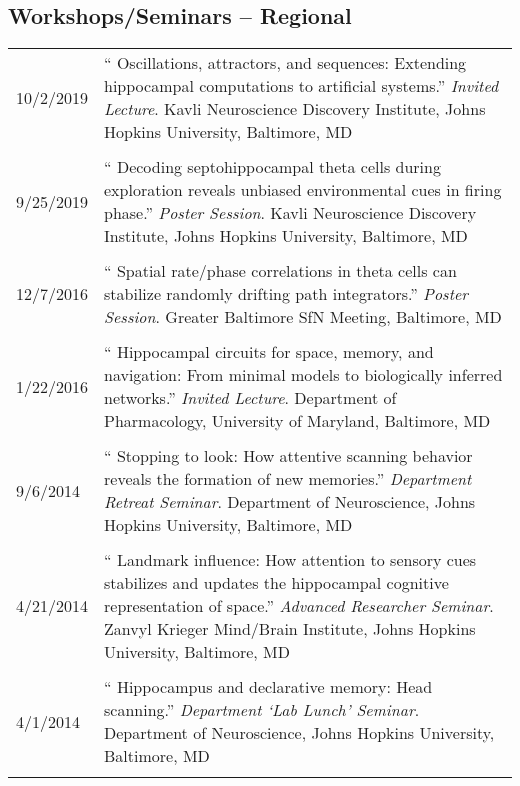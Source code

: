 \documentclass[10pt]{article}
\newcommand{\unpubtitle}[1]{{\color{hopkinsblue} #1}}
\begin{document}
\subsection*{Workshops/Seminars -- Regional}

\begin{longtable}{@{\hspace{0.2in}}l>{\raggedright\arraybackslash}p{}}
  10/2/2019 \hspace{0.1in} & ``\unpubtitle{Oscillations, attractors, and
  sequences: Extending hippocampal computations to artificial systems}.''
  \emph{Invited Lecture}. Kavli Neuroscience Discovery Institute, Johns Hopkins
  University, Baltimore, MD\\
  \tabularnewline
  9/25/2019 & ``\unpubtitle{Decoding septohippocampal theta cells during
  exploration reveals unbiased environmental cues in firing phase}.''
  \emph{Poster Session}. Kavli Neuroscience Discovery Institute, Johns Hopkins
  University, Baltimore, MD\\
  \tabularnewline
  12/7/2016 & ``\unpubtitle{Spatial rate/phase correlations in theta cells
  can stabilize randomly drifting path integrators}.'' \emph{Poster Session}.
  Greater Baltimore SfN Meeting, Baltimore, MD\\
  \tabularnewline
  1/22/2016 & ``\unpubtitle{Hippocampal circuits for space, memory, and
  navigation: From minimal models to biologically inferred networks}.''
  \emph{Invited Lecture}. Department of Pharmacology, University of Maryland,
  Baltimore, MD\\
  \tabularnewline
  9/6/2014 & ``\unpubtitle{Stopping to look: How attentive scanning behavior
  reveals the formation of new memories}.'' \emph{Department Retreat Seminar}.
  Department of Neuroscience, Johns Hopkins University, Baltimore, MD\\
  \tabularnewline
  4/21/2014 & ``\unpubtitle{Landmark influence: How attention to sensory cues
  stabilizes and updates the hippocampal cognitive representation of space}.''
  \emph{Advanced Researcher Seminar}. Zanvyl Krieger Mind/Brain Institute, Johns
  Hopkins University, Baltimore, MD\\
  \tabularnewline
  4/1/2014 & ``\unpubtitle{Hippocampus and declarative memory: Head scanning}.''
  \emph{Department `Lab Lunch' Seminar}. Department of Neuroscience, Johns Hopkins
  University, Baltimore, MD\\
  \tabularnewline
\end{longtable}
\end{document}

